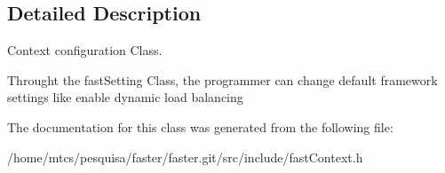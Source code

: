 \subsection{Detailed Description}
Context configuration Class.

Throught the fast\+Setting Class, the programmer can change default framework settings like enable dynamic load balancing 

The documentation for this class was generated from the following file\+:\begin{DoxyCompactItemize}
\item 
/home/mtcs/pesquisa/faster/faster.\+git/src/include/fast\+Context.\+h\end{DoxyCompactItemize}
